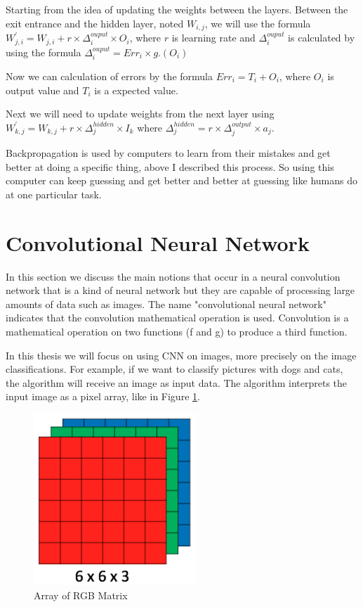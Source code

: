 Starting from the idea of updating the weights between the layers. 
Between the exit entrance and the hidden layer, noted $W_{i,j}$,  we will use the formula 
$W^{'}_{j,i} = W_{j,i} + r \times \Delta_i^{ouput} \times O_i$, where $r$ is learning rate 
and $\Delta_i^{ouput}$ is calculated by using the formula $\Delta_i^{ouput} = Err_i  \times g_{'}(O_i)$

Now we can calculation of errors by the formula $Err_i = T_i + O_i$, where $O_i$ is output value and $T_i$ is a expected value.

Next we will need to update weights from the next layer using $W^{'}_{k,j} = W_{k,j} + r \times \Delta_j^{hidden} \times I_k$ where 
$\Delta_j^{hidden} = r  \times \Delta_j^{output} \times  a_j$.

Backpropagation is used by computers to learn from their mistakes and 
get better at doing a specific thing, above I described this process.
So using this computer can keep guessing and
get better and better at guessing like humans do at one particular task.


\section{Convolutional Neural Network}
In this section we discuss the main notions that occur in 
a neural convolution network that is a  kind of neural network but they are capable of processing large amounts of data such as images.
The name "convolutional neural network" indicates that the convolution mathematical operation is used. 
Convolution is a mathematical operation on two functions (f and g) to produce a third function. \cite{Mallat:2008:WTS:1525499}

In this thesis we will focus on using CNN on images, more precisely on the image classifications.
For example, if we want to classify pictures with dogs and cats,
the algorithm will receive an image as input data.
The algorithm interprets the input image as a pixel array, like in Figure \ref{fig:img-rgb}.

\begin{figure}[htbp]
  \centerline{\includegraphics[scale=0.75]{fig/img-rgb.png}}  
  \caption{Array of RGB Matrix}
  \label{fig:img-rgb}
\end{figure}

